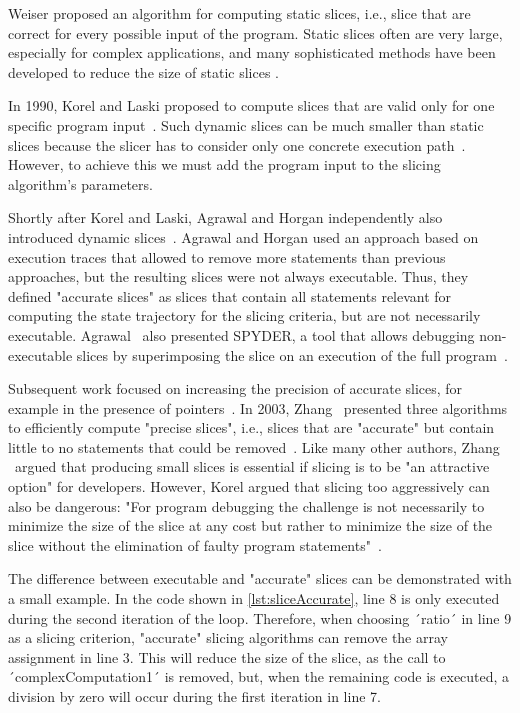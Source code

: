 Weiser proposed an algorithm for computing static slices, i.e., slice that are correct for every possible input of the program.
Static slices often are very large, especially for complex applications, and many sophisticated methods have been developed to reduce the size of static slices .

In 1990, Korel and Laski proposed to compute slices that are valid only for one specific program input~\cite{korel_88_dynamic_program_slicing}.
Such dynamic slices can be much smaller than static slices because the slicer has to consider only one concrete execution path~\cite{venkatesh_95_experimental_results_from_dynamica, hoffner_95_evaluation_and_comparison}.
However, to achieve this we must add the program input to the slicing algorithm's parameters.

Shortly after Korel and Laski, Agrawal and Horgan independently also introduced dynamic slices~\cite{agrawal_90_dynamic_program_slicing}.
Agrawal and Horgan used an approach based on execution traces that allowed to remove more statements than previous approaches, but the resulting slices were not always executable.
Thus, they defined "accurate slices" as slices that contain all statements relevant for computing the state trajectory for the slicing criteria, but are not necessarily executable.
Agrawal \etal\ also presented SPYDER, a tool that allows debugging non-executable slices by superimposing the slice on an execution of the full program~\cite{agrawal_93_debugging_with_dynamic_slicing}.

Subsequent work focused on increasing the precision of accurate slices, for example in the presence of pointers~\cite{atkinson_02_program_slicing_using_dynamic}.
In 2003, Zhang \etal\ presented three algorithms to efficiently compute "precise slices", i.e., slices that are "accurate" but contain little to no statements that could be removed~\cite{zhang_03_precise_dynamic_slicing_algorithms}.
Like many other authors, Zhang \etal\ argued that producing small slices is essential if slicing is to be "an attractive option" for developers.
However, Korel argued that slicing too aggressively can also be dangerous:
"For program debugging the challenge is not necessarily to minimize the size of the slice at any cost but rather to minimize the size of the slice without the elimination of faulty program statements"~\cite{korel_98_dynamic_program_slicing_methods}.

The difference between executable and "accurate" slices can be demonstrated with a small example.
In the code shown in \cref{lst:sliceAccurate}, line 8 is only executed during the second iteration of the loop.
Therefore, when choosing ´ratio´ in line 9 as a slicing criterion, "accurate" slicing algorithms can remove the array assignment in line 3.
This will reduce the size of the slice, as the call to ´complexComputation1´ is removed, but, when the remaining code is executed, a division by zero will occur during the first iteration in line 7.

